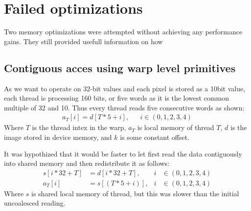 \section{Failed optimizations}
Two memory optimizations were attempted without achieving any performance gains.
They still provided usefull information on how

\subsection{Contiguous acces using warp level primitives} \label{sec:contuguous_access}
As we want to operate on 32-bit values and each pixel is stored as a 10bit value, each thread is processing 160 bits, or five words as it is the lowest common multiple of 32 and 10.
Thus every thread reads five consecutive words as shown:
\begin{align}
    a_T[i] = d[T*5+i], &  & i \in (0,1,2,3,4)
\end{align}
Where $T$ is the thread intex in the warp, $a_T$ is local memory of thread $T$, $d$ is the image stored in device memory, and $k$ is some constant offset.

It was hypothized that it would be faster to let first read the data contiguously into shared memory and then redistribute it as follows:
\begin{align}
    s[i*32+T] & = d[i*32+T],  & i & \in (0,1,2,3,4) \\
    a_T[i]    & = s[(T*5+i)], & i & \in (0,1,2,3,4)
    \label{eq:contiguous_reading}
\end{align}
Where $s$ is shared local memory of thread, but this was slower than the initial uncoalesced reading.


